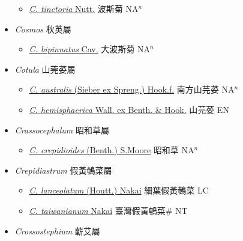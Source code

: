 \begin{itemize}
  \begin{itemize}
        \item[] \href{http://www.theplantlist.org/tpl1.1/search?q=Coreopsis+tinctoria}{\textit{C. tinctoria} Nutt.}   波斯菊 NA$^n$
  \end{itemize}
 \item[] \textit{Cosmos} 秋英屬
                    
  \begin{itemize}
        \item[] \href{http://www.theplantlist.org/tpl1.1/search?q=Cosmos+bipinnatus}{\textit{C. bipinnatus} Cav.}   大波斯菊 NA$^n$
  \end{itemize}
 \item[] \textit{Cotula} 山莞荽屬
                    
  \begin{itemize}
        \item[] \href{http://www.theplantlist.org/tpl1.1/search?q=Cotula+australis}{\textit{C. australis} (Sieber ex Spreng.) Hook.f.}   南方山芫荽 NA$^n$
        \item[] \href{http://www.theplantlist.org/tpl1.1/search?q=Cotula+hemisphaerica}{\textit{C. hemisphaerica} Wall. ex Benth. \& Hook.}   山芫荽 EN
  \end{itemize}
 \item[] \textit{Crassocephalum} 昭和草屬
                    
  \begin{itemize}
        \item[] \href{http://www.theplantlist.org/tpl1.1/search?q=Crassocephalum+crepidioides}{\textit{C. crepidioides} (Benth.) S.Moore}   昭和草 NA$^n$
  \end{itemize}
 \item[] \textit{Crepidiastrum} 假黃鵪菜屬
                    
  \begin{itemize}
        \item[] \href{http://www.theplantlist.org/tpl1.1/search?q=Crepidiastrum+lanceolatum}{\textit{C. lanceolatum} (Houtt.) Nakai}   細葉假黃鵪菜 LC
        \item[] \href{http://www.theplantlist.org/tpl1.1/search?q=Crepidiastrum+taiwanianum}{\textit{C. taiwanianum} Nakai}   臺灣假黃鵪菜\# NT
  \end{itemize}
 \item[] \textit{Crossostephium} 蘄艾屬
                    

\end{itemize}
